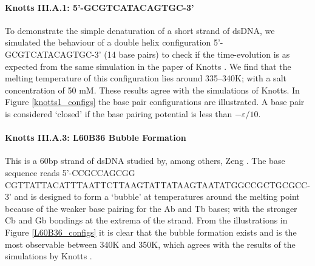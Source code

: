 \paragraph{Knotts III.A.1: 5'-GCGTCATACAGTGC-3'} To demonstrate the simple denaturation of a short strand of dsDNA, we simulated the behaviour of a double helix configuration 5'-GCGTCATACAGTGC-3' (14 base pairs) to check if the time-evolution is as expected from the same simulation in the paper of Knotts \etal \cite{knotts2007coarse}.
We find that the melting temperature of this configuration lies around 335--340K; with a salt concentration of 50 mM.
These results agree with the simulations of Knotts. In Figure \ref{knotts1_configs} the base pair configurations are illustrated. A base pair is considered `closed' if the base pairing potential is less than $-\varepsilon/10$.



\paragraph{Knotts III.A.3: L60B36 Bubble Formation} This is a 60bp strand of dsDNA studied by, among others, Zeng \etal \cite{zeng2003length}.
The base sequence reads 5'-CCGCCAGCGG CGTTATTACATTTAATTCTTAAGTATTATAAGTAATATGGCCGCTGCGCC-3' and is designed to form a `bubble' at temperatures around the melting point because of the weaker base pairing for the Ab and Tb bases; with the stronger Cb and Gb bondings at the extrema of the strand.
From the illustrations in Figure \ref{L60B36_configs} it is clear that the bubble formation exists and is the most observable between 340K and 350K, which agrees with the results of the simulations by Knotts \etal \cite{knotts2007coarse}.


